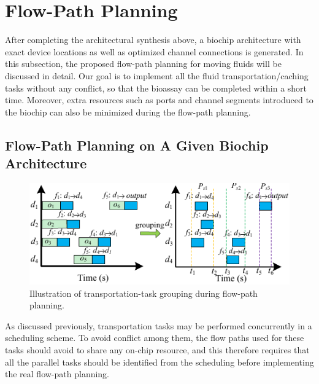 \section{Flow-Path Planning}
\label{sec:flow_paths}

After completing the architectural synthesis above, a biochip architecture with exact device locations as well as optimized channel connections is generated. In this subsection, the proposed flow-path planning for moving fluids will be discussed in detail. Our goal is to implement all the fluid transportation/caching tasks without any conflict, so that the bioassay can be completed within a short time. Moreover, extra resources such as ports and channel segments introduced to the biochip can also be minimized during the flow-path planning.

\subsection{Flow-Path Planning on A Given Biochip Architecture}
\label{sec:constructing_paths_given}

\begin{figure}[t]
    \centering
    \includegraphics[width=1.0\linewidth]{Visio/task_division.pdf}
  \caption{Illustration of transportation-task grouping during flow-path planning.}
      \label{fig:concurrent_set}
\end{figure}

As discussed previously, transportation tasks may be performed concurrently in a scheduling scheme. To avoid conflict among them, the flow paths used for these tasks should avoid to share any on-chip resource, and this therefore requires that all the parallel tasks should be identified from the scheduling before implementing the real flow-path planning.

